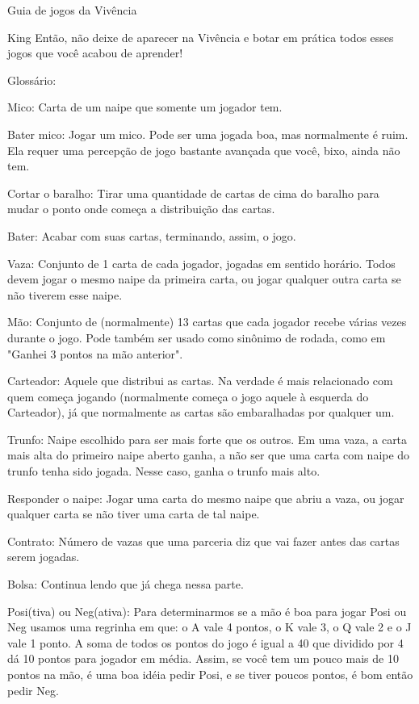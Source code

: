 \begin{secao}{Guia de jogos da Vivência }
\begin{subsecao}{King}
Então, não deixe de aparecer na Vivência e botar em prática todos esses jogos que você acabou de aprender!

\end{subsecao}
\begin{subsecao}{Glossário:}

Mico: Carta de um naipe que somente um jogador tem.

Bater mico: Jogar um mico. Pode ser uma jogada boa, mas normalmente é ruim. Ela requer uma percepção de jogo bastante avançada que você, bixo, ainda não tem.

Cortar o baralho: Tirar uma quantidade de cartas de cima do baralho para mudar o ponto onde começa a distribuição das cartas.

Bater: Acabar com suas cartas, terminando, assim, o jogo.

Vaza: Conjunto de 1 carta de cada jogador, jogadas em sentido horário. Todos devem jogar o mesmo naipe da primeira carta, ou jogar qualquer outra carta se não tiverem esse naipe.

Mão: Conjunto de (normalmente) 13 cartas que cada jogador recebe várias vezes durante o jogo. Pode também ser usado como sinônimo de rodada, como em "Ganhei 3 pontos na mão anterior".

Carteador: Aquele que distribui as cartas. Na verdade é mais relacionado com quem começa jogando (normalmente começa o jogo aquele à esquerda do Carteador), já que normalmente as cartas são embaralhadas por qualquer um.

Trunfo: Naipe escolhido para ser mais forte que os outros. Em uma vaza, a carta mais alta do primeiro naipe aberto ganha, a não ser que uma carta com naipe do trunfo tenha sido jogada. Nesse caso, ganha o trunfo mais alto.

Responder o naipe: Jogar uma carta do mesmo naipe que abriu a vaza, ou jogar qualquer carta se não tiver uma carta de tal naipe.

Contrato: Número de vazas que uma parceria diz que vai fazer antes das cartas serem jogadas.

Bolsa: Continua lendo que já chega nessa parte.

Posi(tiva) ou Neg(ativa): Para determinarmos se a mão é boa para jogar Posi ou Neg usamos uma regrinha em que: o A vale 4 pontos, o K vale 3, o Q vale 2 e o J vale 1 ponto. A soma de todos os pontos do jogo é igual a 40 que dividido por 4 dá 10 pontos para jogador em média. Assim, se você tem um pouco mais de 10 pontos na mão, é uma boa idéia pedir Posi, e se tiver poucos pontos, é bom então pedir Neg.


\end{subsecao}
\end{secao}
